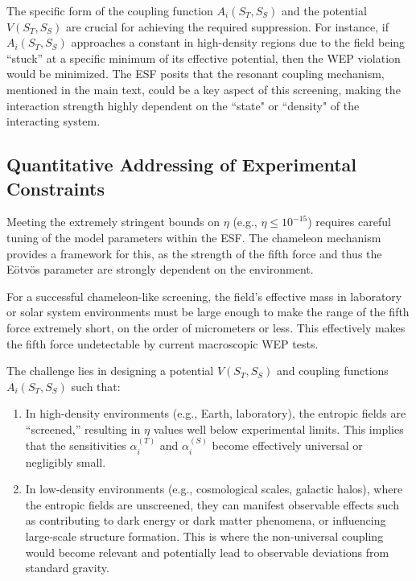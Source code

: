 \documentclass[12pt, a4paper]{article}
\begin{document}
The specific form of the coupling function $A_i(S_T, S_S)$ and the potential $V(S_T, S_S)$ are crucial for achieving the required suppression. For instance, if $A_i(S_T, S_S)$ approaches a constant in high-density regions due to the field being ``stuck'' at a specific minimum of its effective potential, then the WEP violation would be minimized. The ESF posits that the resonant coupling mechanism, mentioned in the main text, could be a key aspect of this screening, making the interaction strength highly dependent on the ``state" or ``density" of the interacting system.

\subsection{Quantitative Addressing of Experimental Constraints}\label{sec:experimental_constraints}

Meeting the extremely stringent bounds on $\eta$ (e.g., $\eta \leq 10^{-15}$) requires careful tuning of the model parameters within the ESF. The chameleon mechanism provides a framework for this, as the strength of the fifth force and thus the Eötvös parameter are strongly dependent on the environment.

For a successful chameleon-like screening, the field's effective mass in laboratory or solar system environments must be large enough to make the range of the fifth force extremely short, on the order of micrometers or less. This effectively makes the fifth force undetectable by current macroscopic WEP tests.

The challenge lies in designing a potential $V(S_T, S_S)$ and coupling functions $A_i(S_T, S_S)$ such that:
\begin{enumerate}
    \item In high-density environments (e.g., Earth, laboratory), the entropic fields are ``screened,'' resulting in $\eta$ values well below experimental limits. This implies that the sensitivities $\alpha_i^{(T)}$ and $\alpha_i^{(S)}$ become effectively universal or negligibly small.
    \item In low-density environments (e.g., cosmological scales, galactic halos), where the entropic fields are unscreened, they can manifest observable effects such as contributing to dark energy or dark matter phenomena, or influencing large-scale structure formation. This is where the non-universal coupling would become relevant and potentially lead to observable deviations from standard gravity.
\end{enumerate}
\end{document}

